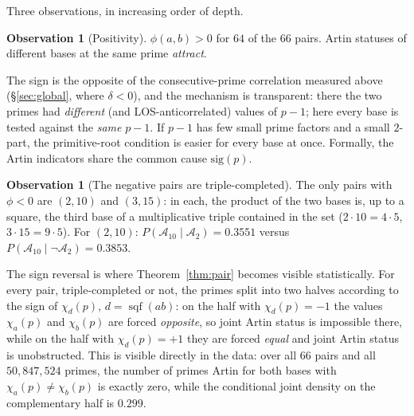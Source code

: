 \documentclass[11pt,reqno]{amsart}
\theoremstyle{plain}
\theoremstyle{definition}
\newtheorem{observation}[theorem]{Observation}
\DeclareMathOperator{\sqf}{sqf}
\newcommand{\Acal}{\mathcal{A}}
\begin{document}
Three observations, in increasing order of depth.

\begin{observation}[Positivity]
\label{obs:positive}
$\phi(a, b) > 0$ for $64$ of the $66$ pairs. Artin statuses of different
bases at the same prime \emph{attract}.
\end{observation}

The sign is the opposite of the consecutive-prime correlation measured above
(\S\ref{sec:global}, where $\delta < 0$), and the
mechanism is transparent: there the two primes had \emph{different} (and
LOS-anticorrelated) values of $p - 1$; here every base is tested against the
\emph{same} $p - 1$. If $p - 1$ has few small prime factors and a small
$2$-part, the primitive-root condition is easier for every base at once.
Formally, the Artin indicators share the common cause $\mathrm{sig}(p)$.

\begin{observation}[The negative pairs are triple-completed]
\label{obs:negative}
The only pairs with $\phi < 0$ are $(2, 10)$ and $(3, 15)$: in each, the
product of the two bases is, up to a square, the third base of a
multiplicative triple contained in the set ($2 \cdot 10 = 4 \cdot 5$,
$3 \cdot 15 = 9 \cdot 5$). For $(2, 10)$:
$P(\Acal_{10} \mid \Acal_2) = 0.3551$ versus
$P(\Acal_{10} \mid \lnot\Acal_2) = 0.3853$.
\end{observation}

The sign reversal is where Theorem~\ref{thm:pair} becomes visible statistically. For every pair, triple-completed or not, the primes split into two halves according to the sign
of $\chi_d(p)$, $d = \sqf(ab)$: on the half with $\chi_d(p) = -1$ the values
$\chi_a(p)$ and $\chi_b(p)$ are forced \emph{opposite}, so joint Artin status
is impossible there, while on the half with $\chi_d(p) = +1$ they are forced
\emph{equal} and joint Artin status is unobstructed. This is visible directly
in the data: over all $66$ pairs and all $50{,}847{,}524$ primes, the number of
primes Artin for both bases with $\chi_a(p) \ne \chi_b(p)$ is exactly zero,
while the conditional joint density on the complementary half is
$0.299$.
\end{document}
